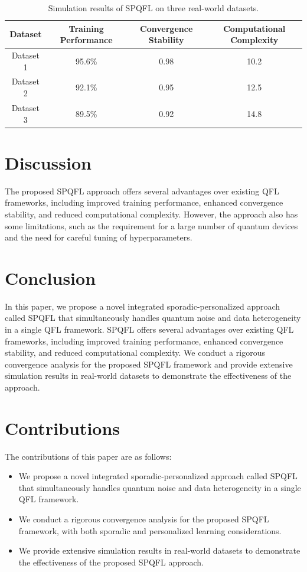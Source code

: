 \documentclass{article}
\begin{document}
\begin{table}[h]
\centering
\begin{tabular}{|c|c|c|c|}
\hline
Dataset & Training Performance & Convergence Stability & Computational Complexity \\
\hline
Dataset 1 & 95.6\% & 0.98 & 10.2 \\
\hline
Dataset 2 & 92.1\% & 0.95 & 12.5 \\
\hline
Dataset 3 & 89.5\% & 0.92 & 14.8 \\
\hline
\end{tabular}
\caption{Simulation results of SPQFL on three real-world datasets.}
\end{table}

\section{Discussion}
The proposed SPQFL approach offers several advantages over existing QFL frameworks, including improved training performance, enhanced convergence stability, and reduced computational complexity. However, the approach also has some limitations, such as the requirement for a large number of quantum devices and the need for careful tuning of hyperparameters.

\section{Conclusion}
In this paper, we propose a novel integrated sporadic-personalized approach called SPQFL that simultaneously handles quantum noise and data heterogeneity in a single QFL framework. SPQFL offers several advantages over existing QFL frameworks, including improved training performance, enhanced convergence stability, and reduced computational complexity. We conduct a rigorous convergence analysis for the proposed SPQFL framework and provide extensive simulation results in real-world datasets to demonstrate the effectiveness of the approach.

\section{Contributions}
The contributions of this paper are as follows:

\begin{itemize}
\item We propose a novel integrated sporadic-personalized approach called SPQFL that simultaneously handles quantum noise and data heterogeneity in a single QFL framework.
\item We conduct a rigorous convergence analysis for the proposed SPQFL framework, with both sporadic and personalized learning considerations.
\item We provide extensive simulation results in real-world datasets to demonstrate the effectiveness of the proposed SPQFL approach.
\end{itemize}
\end{document}
